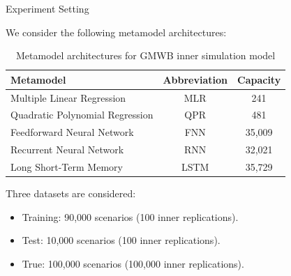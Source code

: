 \documentclass[9pt,handout]{beamer}
\begin{document}

\begin{frame}{Experiment Setting}

    We consider the following metamodel architectures:

    \begin{table}[ht!]
        \centering
        \begin{tabular}{lcc}
            \toprule
            \textbf{Metamodel} & \textbf{Abbreviation} & \textbf{Capacity} \\
            \midrule
            Multiple Linear Regression      & MLR       & 241 \\
            Quadratic Polynomial Regression & QPR       & 481 \\
            Feedforward Neural Network      & FNN       & 35,009 \\
            Recurrent Neural Network        & RNN       & 32,021 \\
            Long Short-Term Memory          & LSTM      & 35,729 \\
            \bottomrule
        \end{tabular}
        \caption{Metamodel architectures for GMWB inner simulation model}
        \label{tab:arch}
    \end{table}

    Three datasets are considered:
    \begin{itemize}
        \item   \textcolor{color10_2}{Training}: 90,000 scenarios (100 inner replications).
        \item   \textcolor{color10_3}{Test}: 10,000 scenarios (100 inner replications).
        \item   \textcolor{color10_5}{True}: 100,000 scenarios (100,000 inner replications).
    \end{itemize}

    
\end{frame}
\end{document}

